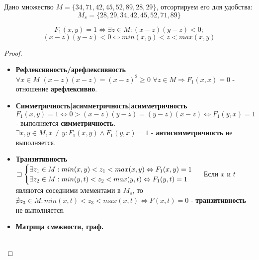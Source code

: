 
\renewcommand*{\proofname}{Решение}

Дано множество \( M = \{34, 71, 42, 45, 52, 89, 28, 29\} \), отсортируем его для удобства: \[ M_s = \{28, 29, 34, 42, 45, 52, 71, 89\} \]

\begin{problem}
\[ F_1(x,y) = 1 \Leftrightarrow \exists z \in M : (x-z)(y-z)<0; \]
\[ (x - z)(y - z) < 0 \Leftrightarrow min(x, y) < z < max(x, y) \]

\end{problem}

\begin{proof} $ $
	\begin{itemize}
  	\item \textbf{Рефлексивность/арефлексивность \\}
  	\( \forall x \in M \)  \( (x - z)(x - z) = (x - z)^2 \geqslant 0 \) 
  	\( \forall z \in M \Rightarrow F_1(x,x) = 0 \) - отношение \textbf{арефлексивно}.
  	\item \textbf{Симметричность|асимметричность|асимметричность \\}
  	\( F_1(x, y) = 1 \Leftrightarrow 0 > (x - z)(y - z) = (y - z)(x - z) \Leftrightarrow F_1(y, x) = 1 \) - выполняется \textbf{симметричность}. \\
  	\( \exists x,y \in M, x \neq y : F_1(x,y) \land F_1(y, x) = 1 \) - \textbf{антисимметричность} не выполняется.
  	\item \textbf{Транзитивность \\}
  	\( \sqsupset
  	\begin{cases}
    \exists z_1 \in M : min(x,y) < z_1 < max(x,y) \Leftrightarrow F_1(x,y) = 1 \\
    \exists z_2 \in M : min(y,t) < z_2 < max(y,t) \Leftrightarrow F_1(y,t) = 1
  	\end{cases} \\ \)
  	Если $x$ и $t$ являются соседними элементами в $M_s$, то \( \nexists z_3 \in M : min(x,t) < z_3 < max(x,t) \Leftrightarrow F(x,t) = 0 \)  - \textbf{транзитивность} не выполняется. 
  	\item \textbf{Матрица смежности, граф. \\}
  	 \\
  	

\end{itemize}
\end{proof}
